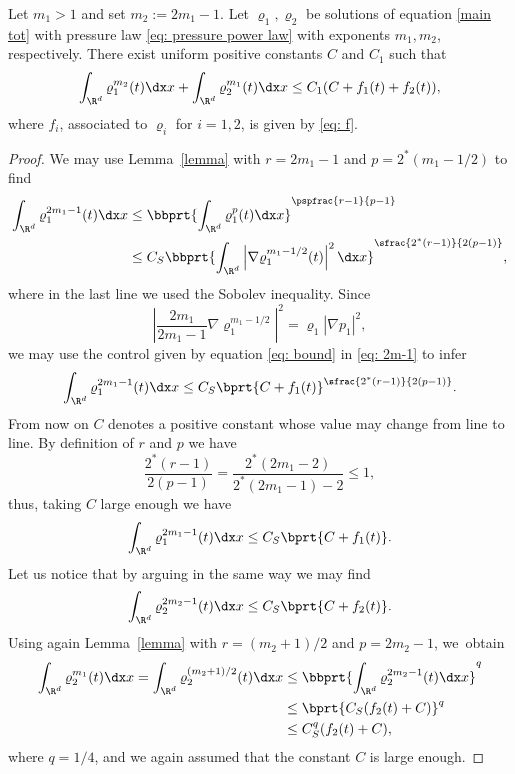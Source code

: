 \begin{proposition}\label{prop: bounds of powers}
Let $m_{1}>1$ and set $m_2:=2m_1-1$. Let $\varrho_1, \varrho_2$ be solutions of equation \eqref{main tot} with pressure law \eqref{eq: pressure power law} with exponents $m_1,m_2$, respectively. There exist uniform positive constants $C$ and $C_1$ such that
\begin{equation*}
\int_{\R^d} \varrho_1^{m_2}(t) \dx x + \int_{\R^d} \varrho_2^{m_1}(t) \dx x \leq C_1(C + f_1(t)+f_2(t)),
\end{equation*}
where $f_i$, associated to $\varrho_i$ for $i=1,2$, is given by \eqref{eq: f}.
\end{proposition}

\begin{proof}
We may use Lemma~\ref{lemma} with $r=2m_1-1$ and $p=2^*(m_1 - 1/2)$ to find
\begin{equation}\label{eq: 2m-1}
\begin{aligned}
\int_{\R^d} \varrho_1^{2m_1-1}(t) \dx x &\leq \bbprt{\int_{\R^d} \varrho_1^{p}(t) \dx x}^{\pspfrac{r-1}{p-1}}\\
&\leq C_S \bbprt{\int_{\R^d} \left|\nabla \varrho_1^{m_1-1/2}(t)\right|^2 \dx x}^{\sfrac{2^*(r-1)}{2(p-1)}},
\end{aligned}
\end{equation}
where in the last line we used the Sobolev inequality.
Since
\begin{equation*}
\left|\frac{2m_{1}}{2{m_{1}}-1}\nabla \varrho_1^{m_1-1/2}\right|^2 = \varrho_1\left|\nabla p_1\right|^2,
\end{equation*}
we may use the control given by equation \eqref{eq: bound} in \eqref{eq: 2m-1} to infer
\begin{align*}
\int_{\R^d} \varrho_1^{2m_1-1}(t) \dx x \leq C_S\bprt{C+ {f_{1}}(t)}^{\sfrac{2^*(r-1)}{2(p-1)}}.
\end{align*}
From now on $C$ denotes a positive constant whose value may change from line to line. By definition of $r$ and $p$ we have
\begin{equation*}
\frac{2^*(r-1)}{2(p-1)}= \frac{2^* (2m_1 -2)}{2^* (2m_1 - 1) -2} \leq 1,
\end{equation*}
thus, taking $C$ large enough we have
\begin{align*}
\int_{\R^d} \varrho_1^{2 m_1-1}(t) \dx x \leq C_S\bprt{C+ {f_{1}}(t)}.
\end{align*}
Let us notice that by arguing in the same way we may find
\begin{align*}
\int_{\R^d} \varrho_2^{2 m_2-1}(t) \dx x \leq C_S\bprt{C+ {f_{2}}(t)}.
\end{align*}
Using again Lemma~\ref{lemma} with $r=(m_2+1)/2$ and $p=2m_2-1$, we~obtain
\begin{align*}
\int_{\R^d} \varrho_2^{m_1}(t) \dx x = \int_{\R^d} \varrho_2^{(m_2+1)/2}(t) \dx x
&\leq \bbprt{\int_{\R^d} \varrho_2^{2m_2-1}(t) \dx x }^{q}\\
&\leq \bprt{C_S({f_{2}}(t)+C)}^q\\
&\leq C_S^q({f_{2}}(t)+C),
\end{align*}
where $q=1/4$, and we again assumed that the constant $C$ is large enough.
\end{proof}

